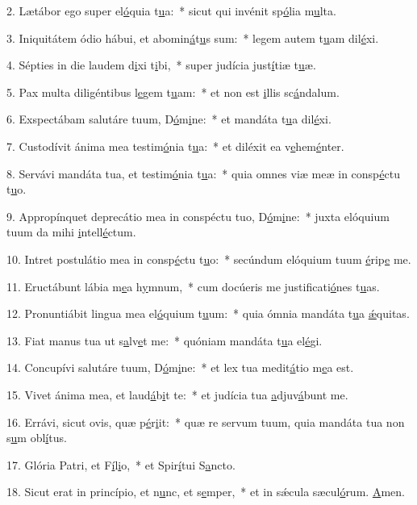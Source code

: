 2. Lætábor ego super el\uline{ó}quia t\uline{u}a:~* sicut qui invénit sp\uline{ó}lia m\uline{u}lta.\par 
3. Iniquitátem ódio hábui, et abomin\uline{á}t\uline{u}s sum:~* legem autem t\uline{u}am dil\uline{é}xi.\par 
4. Sépties in die laudem d\uline{i}xi t\uline{i}bi,~* super judícia just\uline{í}tiæ t\uline{u}æ.\par 
5. Pax multa diligéntibus l\uline{e}gem t\uline{u}am:~* et non est \uline{i}llis sc\uline{á}ndalum.\par 
6. Exspectábam salutáre tuum, D\uline{ó}m\uline{i}ne:~* et mandáta t\uline{u}a dil\uline{é}xi.\par 
7. Custodívit ánima mea testim\uline{ó}nia t\uline{u}a:~* et diléxit ea v\uline{e}hem\uline{é}nter.\par 
8. Servávi mandáta tua, et testim\uline{ó}nia t\uline{u}a:~* quia omnes viæ meæ in consp\uline{é}ctu t\uline{u}o.\par 
9. Appropínquet deprecátio mea in conspéctu tuo, D\uline{ó}m\uline{i}ne:~* juxta elóquium tuum da mihi \uline{i}ntell\uline{é}ctum.\par 
10. Intret postulátio mea in consp\uline{é}ctu t\uline{u}o:~* secúndum elóquium tuum \uline{é}rip\uline{e} me.\par 
11. Eructábunt lábia m\uline{e}a h\uline{y}mnum,~* cum docúeris me justificati\uline{ó}nes t\uline{u}as.\par 
12. Pronuntiábit lingua mea el\uline{ó}quium t\uline{u}um:~* quia ómnia mandáta t\uline{u}a \uline{ǽ}quitas.\par 
13. Fiat manus tua ut s\uline{a}lv\uline{e}t me:~* quóniam mandáta t\uline{u}a el\uline{é}gi.\par 
14. Concupívi salutáre tuum, D\uline{ó}m\uline{i}ne:~* et lex tua medit\uline{á}tio m\uline{e}a est.\par 
15. Vivet ánima mea, et laud\uline{á}b\uline{i}t te:~* et judícia tua \uline{a}djuv\uline{á}bunt me.\par 
16. Errávi, sicut ovis, quæ p\uline{é}r\uline{i}it:~* quæ re servum tuum, quia mandáta tua non s\uline{u}m obl\uline{í}tus.\par 
17. Glória Patri, et F\uline{í}l\uline{i}o,~* et Spir\uline{í}tui S\uline{a}ncto.\par 
18. Sicut erat in princípio, et n\uline{u}nc, et s\uline{e}mper,~* et in sǽcula sæcul\uline{ó}rum. \uline{A}men.\par 
